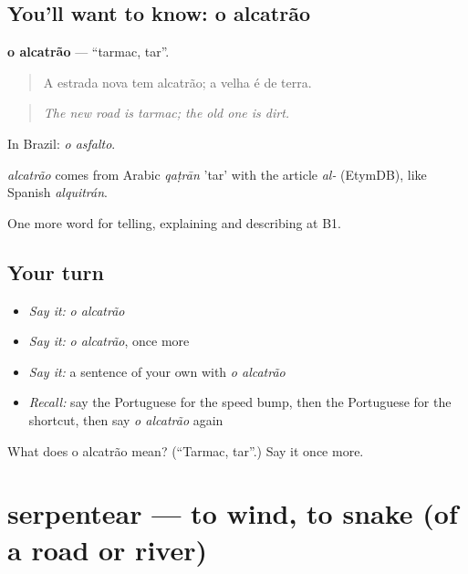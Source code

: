 \subsection*{You'll want to know: o alcatrão}
\textbf{o alcatrão} — \textquotedblleft{}tarmac, tar\textquotedblright{}.

\begin{quote}
A estrada nova tem alcatrão; a velha é de terra.
\end{quote}

\begin{quote}
\emph{The new road is tarmac; the old one is dirt.}
\end{quote}

In Brazil: \emph{o asfalto}.

\begin{cousinweb}
\emph{alcatrão} comes from Arabic \emph{qaṭrān} 'tar' with the article \emph{al-} (EtymDB), like Spanish \emph{alquitrán}.
\end{cousinweb}

\begin{grammarlens}[title={What you've built}]
One more word for telling, explaining and describing at B1.
\end{grammarlens}

\subsection*{Your turn}
\begin{itemize}
\raggedright
  \item \emph{Say it:} \emph{o alcatrão}
  \item \emph{Say it:} \emph{o alcatrão}, once more
  \item \emph{Say it:} a sentence of your own with \emph{o alcatrão}
  \item \emph{Recall:} say the Portuguese for the speed bump, then the Portuguese for the shortcut, then say \emph{o alcatrão} again
\end{itemize}

\begin{tcolorbox}[breakable,colback=teal!4,colframe=teal!35!black,title={Before you move on}]
What does o alcatrão mean? (\textquotedblleft{}Tarmac, tar\textquotedblright{}.) Say it once more.
\end{tcolorbox}
\section[serpentear]{serpentear — to wind, to snake (of a road or river)}

